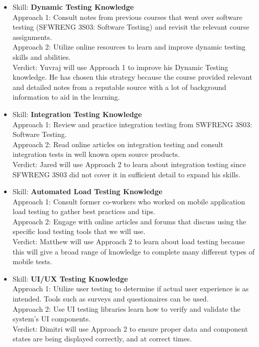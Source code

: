 \documentclass[12pt, titlepage]{article}
\begin{document}
\begin{enumerate}
\begin{itemize}
			\item Skill: \textbf{Dynamic Testing Knowledge}
			\\Approach 1: Consult notes from previous courses that went over software testing (SFWRENG 3S03: Software Testing) and revisit the relevant course assignments.
			\\ Approach 2: Utilize online resources to learn and improve dynamic testing skills and abilities.
			\\ Verdict: Yuvraj will use Approach 1 to improve his Dynamic Testing knowledge. He has chosen this strategy because the course provided relevant and detailed notes from a reputable source with a lot of background information to aid in the learning.
			
			\item Skill: \textbf{Integration Testing Knowledge}
			\\Approach 1: Review and practice integration testing from SWFRENG 3S03: Software Testing.
			\\Approach 2: Read online articles on integration testing and consult integration tests in well known open source products.
			\\Verdict: Jared will use Approach 2 to learn about integration testing since SFWRENG 3S03 did not cover it in sufficient detail to expand his skills.

			\item Skill: \textbf{Automated Load Testing Knowledge}
			\\Approach 1: Consult former co-workers who worked on mobile application load testing to gather best practices and tips.
			\\Approach 2: Engage with online articles and forums that discuss using the specific load testing tools that we will use.
			\\Verdict: Matthew will use Approach 2 to learn about load testing because this will give a broad range of knowledge to complete many different types of mobile tests.
			
			\item Skill: \textbf{UI/UX Testing Knowledge}
			\\Approach 1: Utilize user testing to determine if actual user experience is as intended. Tools such as surveys and questionaires can be used.
			\\Approach 2: Use UI testing libraries learn how to verify and validate the system's UI components.
			\\Verdict: Dimitri will use Approach 2 to ensure proper data and component states are being displayed correctly, and at correct times. 
			
		\end{itemize}

	\end{enumerate}
		
	
\end{document}
